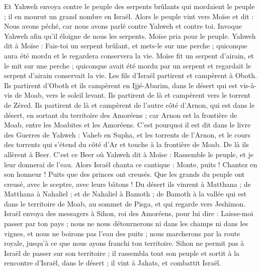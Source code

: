 \begin{multicols}{2}
Et Yahweh envoya contre le peuple des serpents brûlants qui mordaient le peuple ; il en mourut un grand nombre en Israël.
Alors le peuple vint vers Moïse et dit : Nous avons péché, car nous avons parlé contre Yahweh et contre toi. Invoque Yahweh afin qu'il éloigne de nous les serpents. Moïse pria pour le peuple.
Yahweh dit à Moïse : Fais-toi un serpent brûlant, et mets-le sur une perche ; quiconque aura été mordu et le regardera conservera la vie.
Moïse fit un serpent d'airain, et le mit sur une perche ; quiconque avait été mordu par un serpent et regardait le serpent d'airain conservait la vie.
Les fils d'Israël partirent et campèrent à Oboth.
Ils partirent d'Oboth et ils campèrent en Ijjé-Abarim, dans le désert qui est vis-à-vis de Moab, vers le soleil levant.
Ils partirent de là et campèrent vers le torrent de Zéred.
Ils partirent de là et campèrent de l’autre côté d'Arnon, qui est dans le désert, en sortant du territoire des Amoréens ; car Arnon est la frontière de Moab, entre les Moabites et les Amoréens.
C'est pourquoi il est dit dans le livre des Guerres de Yahweh : Vaheb en Supha, et les torrents de l’Arnon,
et le cours des torrents qui s’étend du côté d’Ar et touche à la frontière de Moab.
De là ils allèrent à Beer. C'est ce Beer où Yahweh dit à Moïse : Rassemble le peuple, et je leur donnerai de l'eau.
Alors Israël chanta ce cantique : Monte, puits ! Chantez en son honneur !
Puits que des princes ont creusés. Que les grands du peuple ont creusé, avec le sceptre, avec leurs bâtons ! Du désert ils vinrent à Matthana ;
de Matthana à Nahaliel ; et de Nahaliel à Bamoth ;
de Bamoth à la vallée qui est dans le territoire de Moab, au sommet de Pisga, et qui regarde vers Jeshimon.
Israël envoya des messagers à Sihon, roi des Amoréens, pour lui dire :
Laisse-moi passer par ton pays ; nous ne nous détournerons ni dans les champs ni dans les vignes, et nous ne boirons pas l’eau des puits ; nous marcherons par la route royale, jusqu'à ce que nous ayons franchi ton territoire.
Sihon ne permit pas à Israël de passer sur son territoire ; il rassembla tout son peuple et sortit à la rencontre d’Israël, dans le désert ; il vint à Jahats, et combattit Israël.

\end{multicols}
